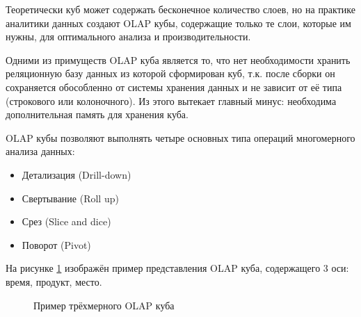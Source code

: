  Теоретически куб может содержать бесконечное количество слоев, но на практике аналитики данных создают OLAP кубы, содержащие только те слои, которые им нужны, для оптимального анализа и производительности.
 
 Одними из примуществ OLAP куба является то, что нет необходимости хранить реляционную базу данных из которой сформирован куб, т.к. после сборки он сохраняется обособленно от системы хранения данных и не зависит от её типа (строкового или колоночного). Из этого вытекает главный минус: необходима дополнительная память для хранения куба.
 
 OLAP кубы позволяют выполнять четыре основных типа операций многомерного анализа данных:
 
\begin{itemize}
 	\item Детализация (Drill-down)
 	
 	\item Свертывание (Roll up)
 	
 	\item Срез (Slice and dice)
 	
 	\item Поворот (Pivot)
 	
\end{itemize}

\newpage

На рисунке \ref{fig:cube-example} изображён пример представления  OLAP куба, содержащего 3 оси: время, продукт, место.\\


\begin{figure}[!h]
	\caption{Пример трёхмерного OLAP куба}
	\label{fig:cube-example}
\end{figure}

